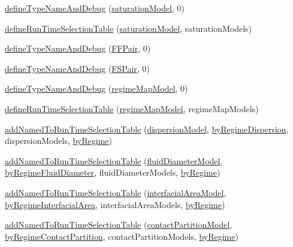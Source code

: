 \begin{DoxyCompactItemize}
\item 
\hyperlink{namespaceFoam_a104e91fe294925b52b9ead24d195b591}{define\+Type\+Name\+And\+Debug} (\hyperlink{classFoam_1_1saturationModel}{saturation\+Model}, 0)
\item 
\hyperlink{namespaceFoam_abee6260d8b90e6bd4600e2cf5346f54d}{define\+Run\+Time\+Selection\+Table} (\hyperlink{classFoam_1_1saturationModel}{saturation\+Model}, saturation\+Models)
\item 
\hyperlink{namespaceFoam_ae123756cb1000dbd573f61c2f57c4048}{define\+Type\+Name\+And\+Debug} (\hyperlink{classFoam_1_1FFPair}{F\+F\+Pair}, 0)
\item 
\hyperlink{namespaceFoam_af35dd79f13caa320cad2aa7339c0f7a2}{define\+Type\+Name\+And\+Debug} (\hyperlink{classFoam_1_1FSPair}{F\+S\+Pair}, 0)
\item 
\hyperlink{namespaceFoam_a1d8583b4359c520c61ecf9c3e8bc863d}{define\+Type\+Name\+And\+Debug} (\hyperlink{classFoam_1_1regimeMapModel}{regime\+Map\+Model}, 0)
\item 
\hyperlink{namespaceFoam_a821b2e3535406de87937e11bbb0cb15f}{define\+Run\+Time\+Selection\+Table} (\hyperlink{classFoam_1_1regimeMapModel}{regime\+Map\+Model}, regime\+Map\+Models)
\item 
\hyperlink{namespaceFoam_a3ccb5c66cc9e2620dafa40206f10fb24}{add\+Named\+To\+Run\+Time\+Selection\+Table} (\hyperlink{classFoam_1_1dispersionModel}{dispersion\+Model}, \hyperlink{namespaceFoam_aca2583acdeaa11914afd02b147b665e0}{by\+Regime\+Dispersion}, dispersion\+Models, \hyperlink{classFoam_1_1byRegime}{by\+Regime})
\item 
\hyperlink{namespaceFoam_ae6dc962da9b750dd5dee5ca408907857}{add\+Named\+To\+Run\+Time\+Selection\+Table} (\hyperlink{classFoam_1_1fluidDiameterModel}{fluid\+Diameter\+Model}, \hyperlink{namespaceFoam_a37b69c3166b91333f06a5a6e7edcbcfe}{by\+Regime\+Fluid\+Diameter}, fluid\+Diameter\+Models, \hyperlink{classFoam_1_1byRegime}{by\+Regime})
\item 
\hyperlink{namespaceFoam_ae7e2097d0a584acfc284ceab171b8086}{add\+Named\+To\+Run\+Time\+Selection\+Table} (\hyperlink{classFoam_1_1interfacialAreaModel}{interfacial\+Area\+Model}, \hyperlink{namespaceFoam_afdf68c0599c54515d78f0565678d1545}{by\+Regime\+Interfacial\+Area}, interfacial\+Area\+Models, \hyperlink{classFoam_1_1byRegime}{by\+Regime})
\item 
\hyperlink{namespaceFoam_a34610b4a5b5f3425797115f7a75c0a68}{add\+Named\+To\+Run\+Time\+Selection\+Table} (\hyperlink{classFoam_1_1contactPartitionModel}{contact\+Partition\+Model}, \hyperlink{namespaceFoam_a41017611e326f39a1a0e4469a6091014}{by\+Regime\+Contact\+Partition}, contact\+Partition\+Models, \hyperlink{classFoam_1_1byRegime}{by\+Regime})

\end{DoxyCompactItemize}
